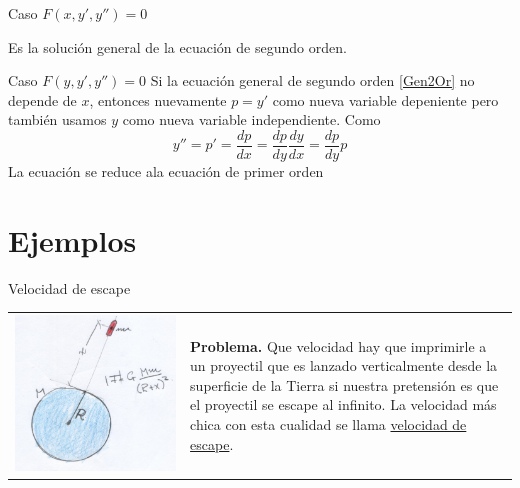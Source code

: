 \documentclass[handout,hyperref={colorlinks=true}]{beamer}
\begin{document}
\begin{frame}{Caso $F(x,y',y'')=0$}
 
Es la solución general de la ecuación de segundo orden.

\end{frame}

\begin{frame}{Caso $F(y,y',y'')=0$}\label{reduc_orden}
Si la ecuación general de segundo orden \eqref{Gen2Or} no depende de $x$, entonces nuevamente $\boxed{p=y'}$ como nueva variable depeniente
pero también usamos $\boxed{y}$ como nueva variable independiente. Como
\[y''=p'=\frac{dp}{dx}=\frac{dp}{dy}\frac{dy}{dx}=\frac{dp}{dy}p\]
La ecuación se reduce ala ecuación de primer orden

\end{frame}

\section{Ejemplos}

\begin{frame}{Velocidad de escape}\label{pag:vel_esc}

\begin{tabular}{m{4cm} m{5cm}}
 \includegraphics[scale=.075]{imagenes/tiro_vertical.jpg}&\textbf{Problema.} Que velocidad hay que imprimirle a un proyectil que es lanzado verticalmente desde la superficie de la Tierra si nuestra pretensión
es que el proyectil se escape al infinito. La velocidad más chica con esta cualidad se llama 
\href{http://es.wikipedia.org/wiki/Velocidad_de_escape}{velocidad de escape}.\\
\end{tabular}
 


\end{frame}
\end{document}
